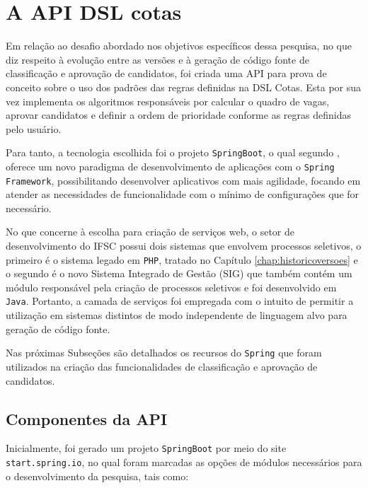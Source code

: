 \section{A API DSL cotas}
\label{apicotas}

Em relação ao desafio abordado nos objetivos específicos dessa pesquisa, no que diz respeito à evolução entre as versões e à geração de código fonte de classificação e aprovação de candidatos, foi criada uma \gls{API} para prova de conceito sobre o uso dos padrões das regras definidas na DSL Cotas. Esta por sua vez implementa os algoritmos responsáveis por calcular o quadro de vagas, aprovar candidatos e definir a ordem de prioridade conforme as regras definidas pelo usuário.


Para tanto, a tecnologia escolhida foi o projeto \texttt{SpringBoot}, o qual segundo , oferece um novo paradigma de desenvolvimento de aplicações com o \texttt{Spring Framework}, possibilitando desenvolver aplicativos com mais agilidade, focando em atender as necessidades de funcionalidade com o mínimo de configurações que for necessário.

No que concerne à escolha para criação de serviços web, o setor de desenvolvimento do \gls{IFSC} possui dois sistemas que envolvem processos seletivos, o primeiro é o sistema legado em \texttt{PHP}, tratado no Capítulo \ref{chap:historicoversoes} e o segundo é o novo Sistema Integrado de Gestão (SIG) que também contém um módulo responsável pela criação de processos seletivos e foi desenvolvido em \texttt{Java}. Portanto, a camada de serviços foi empregada com o intuito de permitir a utilização em sistemas distintos de modo independente de linguagem alvo para geração de código fonte.


Nas próximas Subseções são detalhados os recursos do \texttt{Spring} que foram utilizados na criação das funcionalidades de classificação e aprovação de candidatos.


\subsection{Componentes da API}
\label{componentesapi}

Inicialmente, foi gerado um projeto \texttt{SpringBoot} por meio do site \texttt{start.spring.io}, no qual foram marcadas as opções de módulos necessários para o desenvolvimento da pesquisa, tais como:



